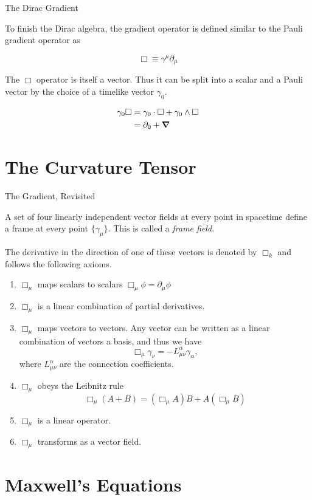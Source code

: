 \documentclass{beamer}
\begin{document}
\begin{frame}{The Dirac Gradient}

To finish the Dirac algebra, the gradient operator is defined similar to the Pauli gradient operator as

\begin{equation}
	\Box \equiv \gamma^\mu\partial_\mu
\end{equation}

\pause

The $\Box$ operator is itself a vector. Thus it can be split into a scalar and a Pauli vector by the choice of a timelike vector $\gamma_0$.

\begin{align*}
	\gamma_0\Box &= \gamma_0\cdot \Box + \gamma_0 \wedge \Box \\
	&= \partial_0 + \grad
\end{align*}

\end{frame}


\section{The Curvature Tensor}

\begin{frame}[allowframebreaks]{The Gradient, Revisited}

A set of four linearly independent vector fields at every point in spacetime define a frame at every point $\{\gamma_\mu\}$. This is called a \emph{frame field}.

The derivative in the direction of one of these vectors is denoted by $\Box_k$ and follows the following axioms.

\begin{enumerate}
	\item $\Box_\mu$ maps scalars to scalars $\Box_\mu \phi = \partial_\mu \phi$
	\item $\Box_\mu$ is a linear combination of partial derivatives.
	\item $\Box_\mu$ maps vectors to vectors. Any vector can be written as a linear combination of vectors a basis, and thus we have
	\begin{equation*}
		\Box_\mu\gamma_\nu = -L^\alpha_{\mu\nu}\gamma_\alpha,
	\end{equation*}
	where $L^\alpha_{\mu\nu}$ are the connection coefficients.
	\item $\Box_\mu$ obeys the Leibnitz rule
	\begin{equation*}
		\Box_\mu (A+B) = (\Box_\mu A)B + A(\Box_\mu B)
	\end{equation*}
	\item $\Box_\mu$ is a linear operator.
	\item $\Box_\mu$ transforms as a vector field.
\end{enumerate}

\end{frame}

\section{Maxwell's Equations}
\end{document}
